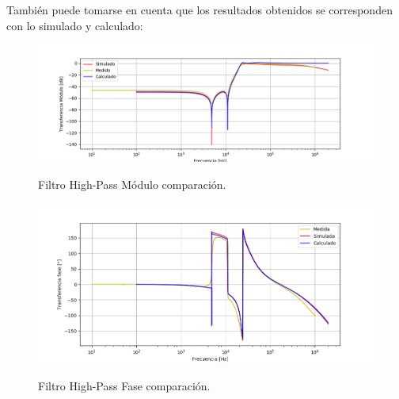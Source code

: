 También puede tomarse en cuenta que los resultados obtenidos se corresponden con lo simulado y calculado:

\begin{figure}[H]
	\centering
	\includegraphics[width=\textwidth]{Imagenes-Ej3/BodeMedCalcSim.png}
	\label{fig:BodeSedraComp}
	\caption{Filtro High-Pass Módulo comparación.}
\end{figure}
\begin{figure}[H]
	\centering
	\includegraphics[width=\textwidth]{Imagenes-Ej3/BodeMedCalcSimFase.png}
	\label{fig:FaseBodeSedraComp}
	\caption{Filtro High-Pass Fase comparación.}
\end{figure}
